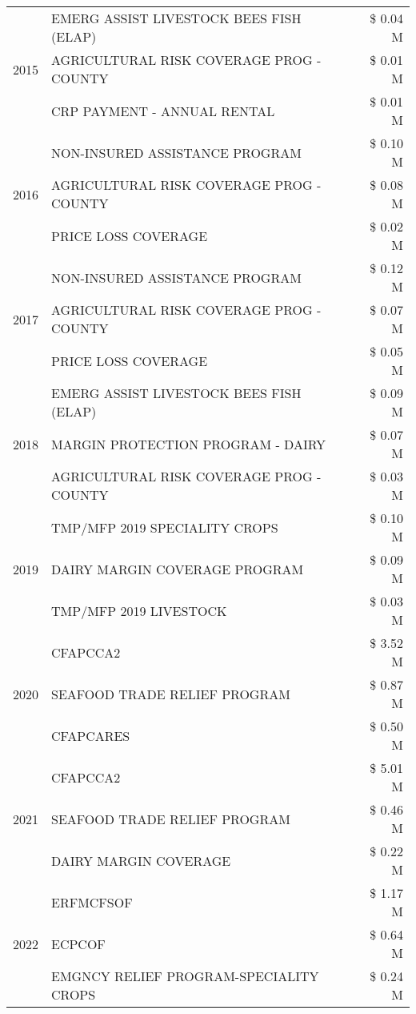 \begin{tabular}{llr}
\cline{1-3}
\multirow[t]{3}{*}{2015} & EMERG ASSIST LIVESTOCK BEES FISH (ELAP) & \$ 0.04 M \\
 & AGRICULTURAL RISK COVERAGE PROG - COUNTY & \$ 0.01 M \\
 & CRP PAYMENT - ANNUAL RENTAL & \$ 0.01 M \\
\cline{1-3}
\multirow[t]{3}{*}{2016} & NON-INSURED ASSISTANCE PROGRAM & \$ 0.10 M \\
 & AGRICULTURAL RISK COVERAGE PROG - COUNTY & \$ 0.08 M \\
 & PRICE LOSS COVERAGE & \$ 0.02 M \\
\cline{1-3}
\multirow[t]{3}{*}{2017} & NON-INSURED ASSISTANCE PROGRAM & \$ 0.12 M \\
 & AGRICULTURAL RISK COVERAGE PROG - COUNTY & \$ 0.07 M \\
 & PRICE LOSS COVERAGE & \$ 0.05 M \\
\cline{1-3}
\multirow[t]{3}{*}{2018} & EMERG ASSIST LIVESTOCK BEES FISH (ELAP) & \$ 0.09 M \\
 & MARGIN PROTECTION PROGRAM - DAIRY & \$ 0.07 M \\
 & AGRICULTURAL RISK COVERAGE PROG - COUNTY & \$ 0.03 M \\
\cline{1-3}
\multirow[t]{3}{*}{2019} & TMP/MFP 2019 SPECIALITY CROPS & \$ 0.10 M \\
 & DAIRY MARGIN COVERAGE PROGRAM & \$ 0.09 M \\
 & TMP/MFP 2019 LIVESTOCK & \$ 0.03 M \\
\cline{1-3}
\multirow[t]{3}{*}{2020} & CFAPCCA2 & \$ 3.52 M \\
 & SEAFOOD TRADE RELIEF PROGRAM & \$ 0.87 M \\
 & CFAPCARES & \$ 0.50 M \\
\cline{1-3}
\multirow[t]{3}{*}{2021} & CFAPCCA2 & \$ 5.01 M \\
 & SEAFOOD TRADE RELIEF PROGRAM & \$ 0.46 M \\
 & DAIRY MARGIN COVERAGE & \$ 0.22 M \\
\cline{1-3}
\multirow[t]{3}{*}{2022} & ERFMCFSOF & \$ 1.17 M \\
 & ECPCOF & \$ 0.64 M \\
 & EMGNCY RELIEF PROGRAM-SPECIALITY CROPS & \$ 0.24 M \\
\cline{1-3}
\bottomrule
\end{tabular}
